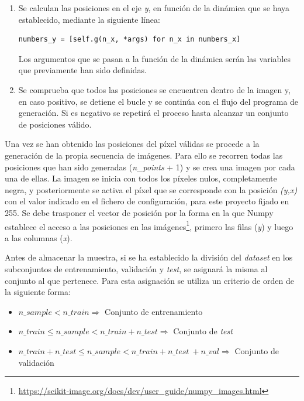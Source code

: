 \begin{enumerate}
  \item Se calculan las posiciones en el eje \textit{y}, en función de la dinámica que se haya establecido, mediante la siguiente línea:
  \vspace{10pt}
  \begin{lstlisting}[frame=single]
  numbers_y = [self.g(n_x, *args) for n_x in numbers_x]
  \end{lstlisting}
  Los argumentos que se pasan a la función de la dinámica serán las variables que previamente han sido definidas.
  
  \item Se comprueba que todos las posiciones se encuentren dentro de la imagen y, en caso positivo, se detiene el bucle y se continúa con el flujo del programa de generación. Si es negativo se repetirá el proceso hasta alcanzar un conjunto de posiciones válido.
\end{enumerate}

Una vez se han obtenido las posiciones del píxel válidas se procede a la generación de la propia secuencia de imágenes. Para ello se recorren todas las posiciones que han sido generadas (\textit{n}\_\textit{points} + 1) y se crea una imagen por cada una de ellas. La imagen se inicia con todos los píxeles nulos, completamente negra, y posteriormente se activa el píxel que se corresponde con la posición \textit{(y,x)} con el valor indicado en el fichero de configuración, para este proyecto fijado en 255. Se debe trasponer el vector de posición por la forma en la que Numpy establece el acceso a las posiciones en las imágenes\footnote{\url{https://scikit-image.org/docs/dev/user\_guide/numpy_images.html}}, primero las filas (\textit{y}) y luego a las columnas (\textit{x}).

Antes de almacenar la muestra, si se ha establecido la división del \textit{dataset} en los subconjuntos de entrenamiento, validación y \textit{test}, se asignará la misma al conjunto al que pertenece. Para esta asignación se utiliza un criterio de orden de la siguiente forma:

\begin{itemize}
    \setlength\itemsep{3pt}
    \item $n\_sample < n\_train \Rightarrow$ Conjunto de entrenamiento
    \item $n\_train \leqslant n\_sample < n\_train + n\_test\Rightarrow$ Conjunto de \textit{test}
    \item $n\_train + n\_test \leqslant n\_sample < n\_train + n\_test\ + n\_val \Rightarrow$ Conjunto de validación
\end{itemize}

